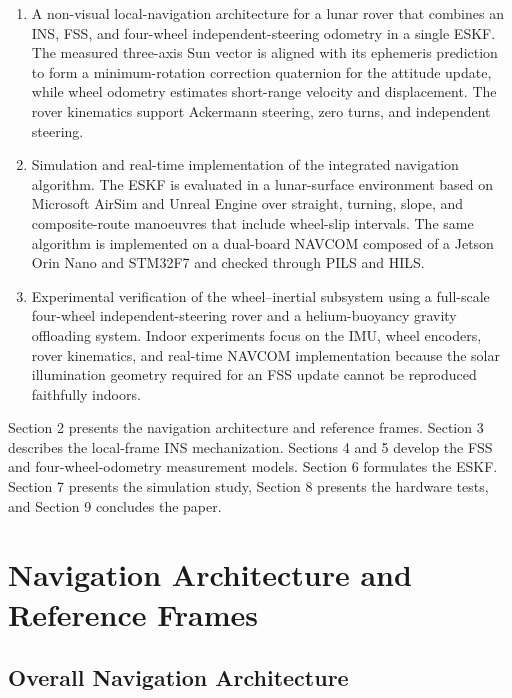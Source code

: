 \documentclass[]{IAC_style}
\begin{document}
\begin{enumerate}[label=(\roman*)]
\item A non-visual local-navigation architecture for a lunar rover that combines an INS, FSS, and four-wheel independent-steering odometry in a single ESKF. The measured three-axis Sun vector is aligned with its ephemeris prediction to form a minimum-rotation correction quaternion for the attitude update, while wheel odometry estimates short-range velocity and displacement. The rover kinematics support Ackermann steering, zero turns, and independent steering.

\item Simulation and real-time implementation of the integrated navigation algorithm. The ESKF is evaluated in a lunar-surface environment based on Microsoft AirSim and Unreal Engine over straight, turning, slope, and composite-route manoeuvres that include wheel-slip intervals. The same algorithm is implemented on a dual-board NAVCOM composed of a Jetson Orin Nano and STM32F7 and checked through PILS and HILS.

\item Experimental verification of the wheel--inertial subsystem using a full-scale four-wheel independent-steering rover and a helium-buoyancy gravity offloading system. Indoor experiments focus on the IMU, wheel encoders, rover kinematics, and real-time NAVCOM implementation because the solar illumination geometry required for an FSS update cannot be reproduced faithfully indoors.
\end{enumerate}

Section 2 presents the navigation architecture and reference frames. Section 3 describes the local-frame INS mechanization. Sections 4 and 5 develop the FSS and four-wheel-odometry measurement models. Section 6 formulates the ESKF. Section 7 presents the simulation study, Section 8 presents the hardware tests, and Section 9 concludes the paper.

\section{Navigation Architecture and Reference Frames}

\subsection{Overall Navigation Architecture}
\end{document}

